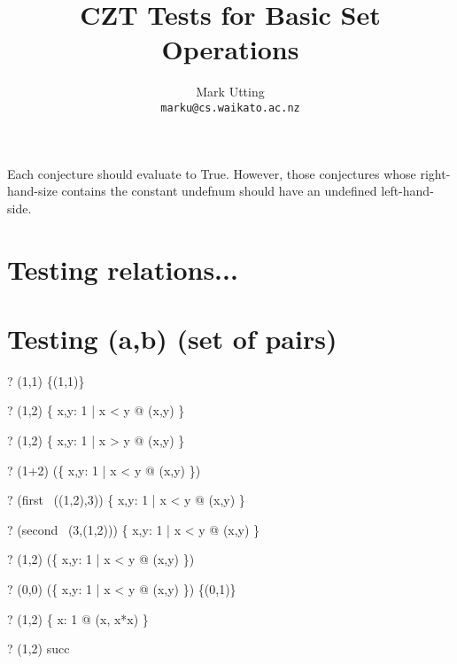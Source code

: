 \documentclass{article}
\title{CZT Tests for Basic Set Operations}
\author{Mark Utting \\ \texttt{marku@cs.waikato.ac.nz}}
\begin{document}
\maketitle

Each conjecture should evaluate to True.
However, those conjectures whose right-hand-size contains
the constant undefnum should have an undefined left-hand-side.


\section{Testing relations...}

\section{Testing (a,b) \in (set of pairs)}
\begin{zed} \vdash? (1,1) \in \{(1,1)\} \end{zed}
\begin{zed} \vdash? (1,2) \in \{ x,y: 1  | x < y @ (x,y) \} \end{zed}
\begin{zed} \vdash? (1,2) \notin \{ x,y: 1  | x > y @ (x,y) \} \end{zed}
\begin{zed} \vdash? (1+2) \in (\ran \{ x,y: 1  | x < y @ (x,y) \}) \end{zed}
\begin{zed} \vdash? (first~ ((1,2),3)) \in \{ x,y: 1  | x < y @ (x,y) \} \end{zed}
\begin{zed} \vdash? (second~ (3,(1,2))) \in \{ x,y: 1  | x < y @ (x,y) \} \end{zed}
\begin{zed} \vdash? (1,2) \in    (\{ x,y: 1  | x < y @ (x,y) \}) \cup \emptyset \end{zed}
\begin{zed} \vdash? (0,0) \notin (\{ x,y: 1  | x < y @ (x,y) \}) \cap \{(0,1)\} \end{zed}
\begin{zed} \vdash? (1,2) \notin \{ x: 1  @ (x, x*x) \} \end{zed}
\begin{zed} \vdash? (1,2) \in succ \end{zed}
\end{document}
